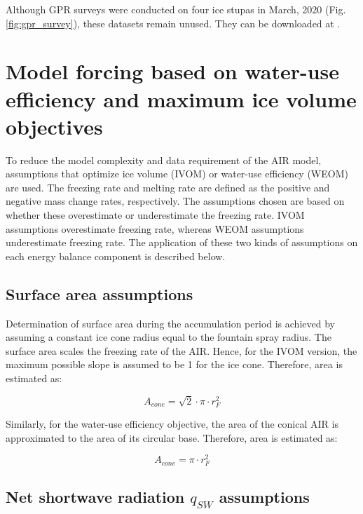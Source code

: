 Although \ac{GPR} surveys were conducted on four ice stupas in March, 2020 (Fig. \ref{fig:gpr_survey}),
these datasets remain unused. They can be downloaded at \citet{balasubramanian_suryanarayanan_2022_7056646}.

\section{Model forcing based on water-use efficiency and maximum ice volume objectives}
\label{sec:auto_software}

To reduce the model complexity and data requirement of the \ac{AIR} model, assumptions that optimize ice volume (IVOM) or
water-use efficiency (WEOM) are used. The freezing rate and melting rate are defined as the positive and
negative mass change rates, respectively. The assumptions chosen are based on whether these overestimate or
underestimate the freezing rate. IVOM assumptions overestimate freezing rate, whereas WEOM assumptions
underestimate freezing rate. The application of these two kinds of assumptions on each energy balance component
is described below. 

\subsection{Surface area assumptions}

Determination of surface area during the accumulation period is achieved by assuming a constant ice cone
radius equal to the fountain spray radius. The surface area scales the freezing rate of the \ac{AIR}. Hence, for the
IVOM version, the maximum possible slope is assumed to be 1 for the ice cone. Therefore, area is estimated as:  

\begin{equation} A_{cone} =\sqrt{2} \cdot \pi \cdot r_{F}^2  \end{equation}

Similarly, for the water-use efficiency objective, the area of the conical \ac{AIR} is approximated to the area of
its circular base. Therefore, area is estimated as:

\begin{equation} A_{cone} =\pi \cdot r_{F}^2  \end{equation}

\subsection{Net shortwave radiation \texorpdfstring{$q_{SW}$}{Lg} assumptions}
\label{sec:SW}

